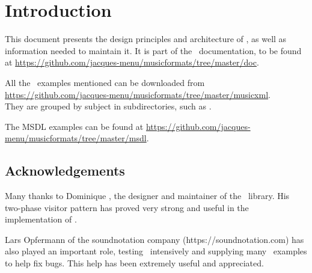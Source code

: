 



\chapter{Introduction}

This document presents the design principles and architecture of \mf, as well as information needed to maintain it. It is part of the \mf\ documentation, to be found at \url{https://github.com/jacques-menu/musicformats/tree/master/doc}.

All the \mxml\ examples mentioned can be downloaded from \url{https://github.com/jacques-menu/musicformats/tree/master/musicxml}.\\
They are grouped by subject in subdirectories, such as .

The MSDL examples can be found at \url{https://github.com/jacques-menu/musicformats/tree/master/msdl}.


\section{Acknowledgements}

Many thanks to Dominique \fober, the designer and maintainer of the \libmusicxml\ library. His two-phase visitor pattern has proved very strong and useful in the implementation of \mf.

Lars Opfermann of the soundnotation company (https://soundnotation.com) has also played an important role, testing \xmlToLy\ intensively and supplying many \mxml\ examples to help fix bugs.
This help has been extremely useful and appreciated.


